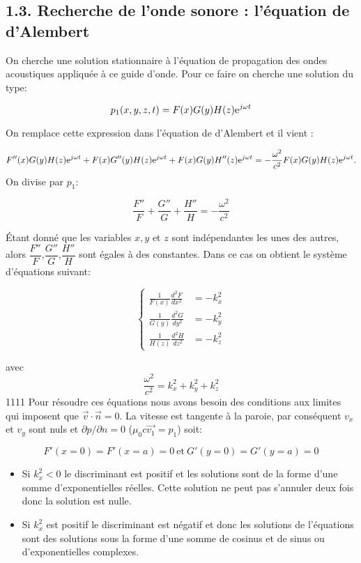 \documentclass[french, a4paper, 10pt, twocolumn, landscape]{article}
\begin{document}
\subsection*{1.3. Recherche de l'onde sonore : l'équation de d'Alembert}
On cherche une solution stationnaire à l'équation de propagation des ondes acoustiques appliquée à ce guide d'onde. Pour ce faire on cherche une solution du type:

\begin{equation}
	p_1(x,y,z,t) = F(x)G(y)H(z){\rm e}^{j\omega t}
\end{equation}

On remplace cette expression dans l'équation de d'Alembert et il vient : 

\begin{dmath}
F''(x)G(y)H(z){\rm e}^{j\omega t}+ F(x)G''(y)H(z){\rm e}^{j\omega t} + F(x)G(y)H''(z){\rm e}^{j\omega t}=-\frac{\omega^2}{c^2}F(x)G(y)H(z){\rm e}^{j\omega t}.
\end{dmath}
On divise par $p_1$: 

\[\frac{F''}{F} + \frac{G''}{G} +\frac{H''}{H}=-\frac{\omega^2}{c^2}\]

Étant donné que les variables $x,y$ et $z$ sont indépendantes les unes des autres, alors $\dfrac{F''}{F}$,$\dfrac{G''}{G}$,$\dfrac{H''}{H}$ sont égales à des constantes. Dans ce cas on obtient le système d'équations suivant: 

\begin{equation}
    \left\{
    \begin{array}{ll}
        
	\frac{1}{F(x)}\frac{d^2 F}{dx^2} &=-k_x^2 \\
	\frac{1}{G(y)}\frac{d^2 G}{dy^2} &=-k_y^2 \\
	\frac{1}{H(z)}\frac{d^2 H}{dz^2} &=-k_z^2

\end{array}
    \right.
\end{equation}

avec  $$\dfrac{\omega^2}{c^2}= k_x^2+k_y^2+k_z^2$$
1111
Pour résoudre ces équations nous avons besoin des conditions aux limites qui imposent que $\vec{v}\cdot \vec{n} = 0$. La vitesse est tangente à la paroie, par conséquent $v_x$ et $v_y$ sont nuls et $\partial p/\partial n = 0$  ($\mu_0 c \vec{v_1} = p_1$) soit:

$$F'(x=0)=F'(x=a)= 0~\text{et}~ G'(y=0)=G'(y=a)=0$$


\begin{itemize}
    \item Si $k_x^2<0$ le discriminant est positif et les solutions sont de la forme d'une somme d'exponentielles réelles. Cette solution ne peut pas s'annuler deux fois donc la solution est nulle.
    \item Si $k_x^2$ est positif le discriminant est négatif et donc les solutions de l'équations sont des solutions sous la forme d'une somme de cosinus et de sinus ou d'exponentielles complexes.
\end{itemize}
\end{document}
